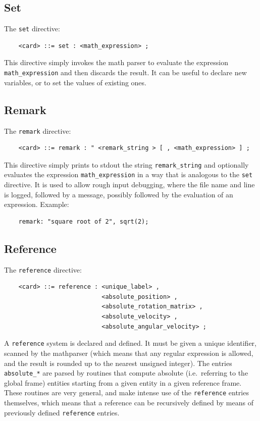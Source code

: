 \documentclass[10pt,dvips]{report}
\begin{document}
\subsection{Set}
The {\tt set} directive:
\begin{verbatim}
    <card> ::= set : <math_expression> ;
\end{verbatim}
This directive simply invokes the math parser to evaluate the expression
{\tt math\_expression} and then discards the result. It can be useful
to declare new variables, or to set the values of existing ones.

\subsection{Remark}
The {\tt remark} directive:
\begin{verbatim}
    <card> ::= remark : " <remark_string > [ , <math_expression> ] ;
\end{verbatim}
This directive simply prints to stdout the string {\tt remark\_string} and
optionally evaluates the expression {\tt math\_expression} in a way that is
analogous to the {\tt set} directive.
It is used to allow rough input debugging, where the file name and line 
is logged, followed by a message, possibly followed by the evaluation 
of an expression. 
Example:
\begin{verbatim}
    remark: "square root of 2", sqrt(2);
\end{verbatim}

\subsection{Reference}
The {\tt reference} directive:
\begin{verbatim}
    <card> ::= reference : <unique_label> , 
                           <absolute_position> ,
                           <absolute_rotation_matrix> ,
                           <absolute_velocity> ,
                           <absolute_angular_velocity> ;
\end{verbatim}
A {\tt reference} system is declared and defined.
It must be given a unique identifier, scanned by the mathparser
(which means that any regular expression is allowed, and the result is
rounded up to the nearest unsigned integer).
The entries {\tt absolute\_*} are parsed by routines that
compute absolute (i.e.\ referring to the global frame) entities
starting from a given entity in a given reference frame.
These routines are very general, and make intense use of the 
{\tt reference} entries themselves, which means that a reference 
can be recursively defined by means of previously defined 
{\tt reference} entries.
\end{document}
